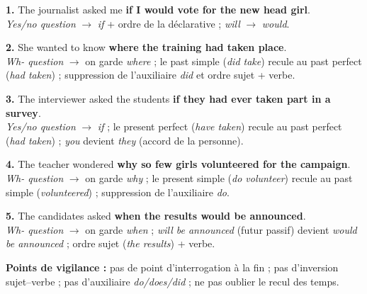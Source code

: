 \documentclass[11pt]{article}
\begin{document}
\begin{corrige}

\textbf{1.} The journalist asked me \textbf{if I would vote for the new head girl}.\\
\emph{Yes/no question} $\rightarrow$ \emph{if} + ordre de la déclarative ; \emph{will} $\rightarrow$ \emph{would}.

\textbf{2.} She wanted to know \textbf{where the training had taken place}.\\
\emph{Wh- question} $\rightarrow$ on garde \emph{where} ; le past simple (\emph{did take}) recule au past perfect (\emph{had taken}) ; suppression de l'auxiliaire \emph{did} et ordre sujet + verbe.

\textbf{3.} The interviewer asked the students \textbf{if they had ever taken part in a survey}.\\
\emph{Yes/no question} $\rightarrow$ \emph{if} ; le present perfect (\emph{have taken}) recule au past perfect (\emph{had taken}) ; \emph{you} devient \emph{they} (accord de la personne).

\textbf{4.} The teacher wondered \textbf{why so few girls volunteered for the campaign}.\\
\emph{Wh- question} $\rightarrow$ on garde \emph{why} ; le present simple (\emph{do volunteer}) recule au past simple (\emph{volunteered}) ; suppression de l'auxiliaire \emph{do}.

\textbf{5.} The candidates asked \textbf{when the results would be announced}.\\
\emph{Wh- question} $\rightarrow$ on garde \emph{when} ; \emph{will be announced} (futur passif) devient \emph{would be announced} ; ordre sujet (\emph{the results}) + verbe.

\textbf{Points de vigilance :} pas de point d'interrogation à la fin ; pas d'inversion sujet--verbe ; pas d'auxiliaire \emph{do/does/did} ; ne pas oublier le recul des temps.
\end{corrige}
\end{document}
